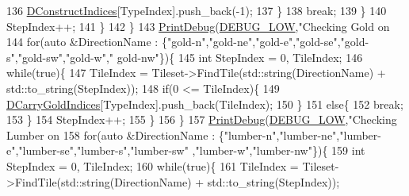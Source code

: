 \begin{DoxyCode}
{{136                             \hyperlink{classCAssetRenderer_a1790a8f6992efbb3fea59dde42a3cacb}{DConstructIndices}[TypeIndex].push\_back(-1);
137                         \}
138                         \textcolor{keywordflow}{break};   
139                     \}
140                     StepIndex++;
141                 \}
142             \}
143             \hyperlink{Debug_8h_aa5f00f5537c9760f6ae1782460748ab9}{PrintDebug}(\hyperlink{Debug_8h_a3a5f3fc09784650d8388cb854882f840}{DEBUG\_LOW},\textcolor{stringliteral}{"Checking Gold on %
144             \textcolor{keywordflow}{for}(\textcolor{keyword}{auto} &DirectionName : \{\textcolor{stringliteral}{"gold-n"},\textcolor{stringliteral}{"gold-ne"},\textcolor{stringliteral}{"gold-e"},\textcolor{stringliteral}{"gold-se"},\textcolor{stringliteral}{"gold-s"},\textcolor{stringliteral}{"gold-sw"},\textcolor{stringliteral}{"gold-w"},\textcolor{stringliteral}{"
      gold-nw"}\})\{
145                 \textcolor{keywordtype}{int} StepIndex = 0, TileIndex;
146                 \textcolor{keywordflow}{while}(\textcolor{keyword}{true})\{
147                     TileIndex = Tileset->FindTile(std::string(DirectionName) + std::to\_string(StepIndex));
148                     \textcolor{keywordflow}{if}(0 <= TileIndex)\{
149                         \hyperlink{classCAssetRenderer_aaf8c772b7d3fbe8c145282e5106749d6}{DCarryGoldIndices}[TypeIndex].push\_back(TileIndex);
150                     \}
151                     \textcolor{keywordflow}{else}\{
152                         \textcolor{keywordflow}{break};   
153                     \}
154                     StepIndex++;
155                 \}
156             \}
157             \hyperlink{Debug_8h_aa5f00f5537c9760f6ae1782460748ab9}{PrintDebug}(\hyperlink{Debug_8h_a3a5f3fc09784650d8388cb854882f840}{DEBUG\_LOW},\textcolor{stringliteral}{"Checking Lumber on %
158             \textcolor{keywordflow}{for}(\textcolor{keyword}{auto} &DirectionName : \{\textcolor{stringliteral}{"lumber-n"},\textcolor{stringliteral}{"lumber-ne"},\textcolor{stringliteral}{"lumber-e"},\textcolor{stringliteral}{"lumber-se"},\textcolor{stringliteral}{"lumber-s"},\textcolor{stringliteral}{"lumber-sw"}
      ,\textcolor{stringliteral}{"lumber-w"},\textcolor{stringliteral}{"lumber-nw"}\})\{
159                 \textcolor{keywordtype}{int} StepIndex = 0, TileIndex;
160                 \textcolor{keywordflow}{while}(\textcolor{keyword}{true})\{
161                     TileIndex = Tileset->FindTile(std::string(DirectionName) + std::to\_string(StepIndex));
}}}}
\end{DoxyCode}
